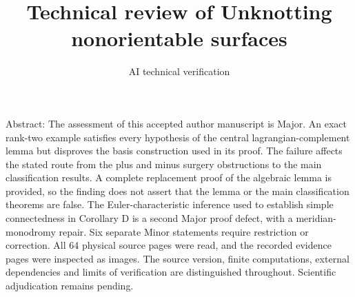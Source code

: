 \documentclass[10pt]{article}
\title{Technical review of
Unknotting nonorientable surfaces}
\author{AI technical verification}
\date{}
\begin{document}
\maketitle
Abstract: The assessment of this accepted author manuscript is Major. An exact rank-two example satisfies every hypothesis of the central lagrangian-complement lemma but disproves the basis construction used in its proof. The failure affects the stated route from the plus and minus surgery obstructions to the main classification results. A complete replacement proof of the algebraic lemma is provided, so the finding does not assert that the lemma or the main classification theorems are false. The Euler-characteristic inference used to establish simple connectedness in Corollary D is a second Major proof defect, with a meridian-monodromy repair. Six separate Minor statements require restriction or correction. All 64 physical source pages were read, and the recorded evidence pages were inspected as images. The source version, finite computations, external dependencies and limits of verification are distinguished throughout. Scientific adjudication remains pending.\par
\end{document}

